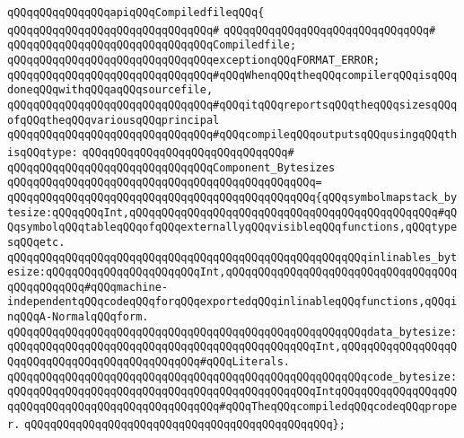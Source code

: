 \verb|qQQqqQQqqQQqqQQqapiqQQqCompiledfileqQQq{|\newline
\verb|qQQqqQQqqQQqqQQqqQQqqQQqqQQqqQQq#|\newline
\verb|qQQqqQQqqQQqqQQqqQQqqQQqqQQqqQQq#|\newline
\verb|qQQqqQQqqQQqqQQqqQQqqQQqqQQqqQQqCompiledfile;|\newline
\newline
\verb|qQQqqQQqqQQqqQQqqQQqqQQqqQQqqQQqexceptionqQQqFORMAT_ERROR;|\newline
\newline
\newline
\verb|qQQqqQQqqQQqqQQqqQQqqQQqqQQqqQQq#qQQqWhenqQQqtheqQQqcompilerqQQqisqQQqdoneqQQqwithqQQqaqQQqsourcefile,|\newline
\verb|qQQqqQQqqQQqqQQqqQQqqQQqqQQqqQQq#qQQqitqQQqreportsqQQqtheqQQqsizesqQQqofqQQqtheqQQqvariousqQQqprincipal|\newline
\verb|qQQqqQQqqQQqqQQqqQQqqQQqqQQqqQQq#qQQqcompileqQQqoutputsqQQqusingqQQqthisqQQqtype:|\newline
\verb|qQQqqQQqqQQqqQQqqQQqqQQqqQQqqQQq#|\newline
\verb|qQQqqQQqqQQqqQQqqQQqqQQqqQQqqQQqComponent_Bytesizes|\newline
\verb|qQQqqQQqqQQqqQQqqQQqqQQqqQQqqQQqqQQqqQQqqQQqqQQq=|\newline
\verb|qQQqqQQqqQQqqQQqqQQqqQQqqQQqqQQqqQQqqQQqqQQqqQQq{qQQqsymbolmapstack_bytesize:qQQqqQQqInt,qQQqqQQqqQQqqQQqqQQqqQQqqQQqqQQqqQQqqQQqqQQqqQQq#qQQqsymbolqQQqtableqQQqofqQQqexternallyqQQqvisibleqQQqfunctions,qQQqtypesqQQqetc.|\newline
\verb|qQQqqQQqqQQqqQQqqQQqqQQqqQQqqQQqqQQqqQQqqQQqqQQqqQQqqQQqinlinables_bytesize:qQQqqQQqqQQqqQQqqQQqqQQqInt,qQQqqQQqqQQqqQQqqQQqqQQqqQQqqQQqqQQqqQQqqQQqqQQq#qQQqmachine-independentqQQqcodeqQQqforqQQqexportedqQQqinlinableqQQqfunctions,qQQqinqQQqA-NormalqQQqform.|\newline
\verb|qQQqqQQqqQQqqQQqqQQqqQQqqQQqqQQqqQQqqQQqqQQqqQQqqQQqqQQqdata_bytesize:qQQqqQQqqQQqqQQqqQQqqQQqqQQqqQQqqQQqqQQqqQQqqQQqInt,qQQqqQQqqQQqqQQqqQQqqQQqqQQqqQQqqQQqqQQqqQQqqQQq#qQQqLiterals.|\newline
\verb|qQQqqQQqqQQqqQQqqQQqqQQqqQQqqQQqqQQqqQQqqQQqqQQqqQQqqQQqcode_bytesize:qQQqqQQqqQQqqQQqqQQqqQQqqQQqqQQqqQQqqQQqqQQqqQQqIntqQQqqQQqqQQqqQQqqQQqqQQqqQQqqQQqqQQqqQQqqQQqqQQqqQQq#qQQqTheqQQqcompiledqQQqcodeqQQqproper.|\newline
\verb|qQQqqQQqqQQqqQQqqQQqqQQqqQQqqQQqqQQqqQQqqQQqqQQq};|\newline
\newline
